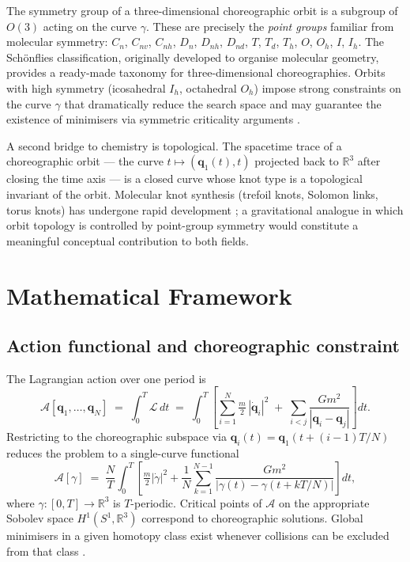\documentclass[12pt, a4paper]{article}
\theoremstyle{definition}
\newcommand{\R}{\mathbb{R}}
\newcommand{\q}{\mathbf{q}}
\newcommand{\Action}{\mathcal{A}}
\newcommand{\Lag}{\mathcal{L}}
\begin{document}
The symmetry group of a three-dimensional choreographic orbit is a
subgroup of $O(3)$ acting on the curve $\gamma$. These are precisely the
\emph{point groups} familiar from molecular symmetry: $C_n$, $C_{nv}$,
$C_{nh}$, $D_n$, $D_{nh}$, $D_{nd}$, $T$, $T_d$, $T_h$, $O$, $O_h$,
$I$, $I_h$. The Sch\"onflies classification, originally developed to
organise molecular geometry, provides a ready-made taxonomy for three-di\-men\-sional
choreographies. Orbits with high symmetry (icosahedral $I_h$, octahedral
$O_h$) impose strong constraints on the curve $\gamma$ that dramatically
reduce the search space and may guarantee the existence of minimisers
via symmetric criticality arguments \cite{Palais1979}.

A second bridge to chemistry is topological. The spacetime trace of a
choreographic orbit — the curve $t \mapsto (\q_1(t), t)$ projected back
to $\R^3$ after closing the time axis — is a closed curve whose knot type
is a topological invariant of the orbit. Molecular knot synthesis
(trefoil knots, Solomon links, torus knots) has undergone rapid
development \cite{Stoddart2020}; a gravitational analogue in which orbit
topology is controlled by point-group symmetry would constitute a
meaningful conceptual contribution to both fields.

\section{Mathematical Framework}

\subsection{Action functional and choreographic constraint}

The Lagrangian action over one period is
\[
  \Action[\q_1, \ldots, \q_N]
  \;=\;
  \int_0^T \Lag\,dt
  \;=\;
  \int_0^T
  \left[
    \sum_{i=1}^N \tfrac{m}{2}\,|\dot{\q}_i|^2
    \;+\;
    \sum_{i < j} \frac{Gm^2}{|\q_i - \q_j|}
  \right] dt.
\]
Restricting to the choreographic subspace via $\q_i(t) = \q_1(t +
(i-1)T/N)$ reduces the problem to a single-curve functional
\[
  \Action[\gamma]
  \;=\;
  \frac{N}{T}\int_0^T
  \left[
    \tfrac{m}{2}|\dot\gamma|^2
    + \frac{1}{N}\sum_{k=1}^{N-1}
      \frac{Gm^2}{|\gamma(t) - \gamma(t + kT/N)|}
  \right] dt,
\]
where $\gamma : [0,T] \to \R^3$ is $T$-periodic. Critical points of
$\Action$ on the appropriate Sobolev space $H^1(S^1, \R^3)$ correspond
to choreographic solutions. Global minimisers in a given homotopy class
exist whenever collisions can be excluded from that class
\cite{CM2000, Terracini2004}.
\end{document}

